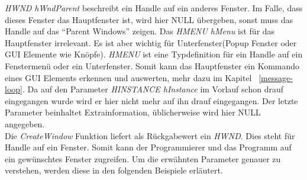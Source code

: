 \textit{HWND hWndParent} beschreibt ein Handle auf ein anderes Fenster. Im Falle, dass dieses Fenster das Hauptfenster ist, wird hier NULL übergeben, sonst muss das Handle auf das "`Parent Windows"' zeigen. Das \textit{HMENU hMenu} ist für das Hauptfenster irrelevant. Es ist aber wichtig für Unterfenster(Popup Fenster oder GUI Elemente wie Knöpfe). \textit{HMENU} ist eine Typdefinition für ein Handle auf ein Fenstermenü oder ein Unterfenster. Somit kann das Hauptfenster ein Kommando eines GUI Elements erkennen und auswerten, mehr dazu im Kapitel ~\ref{message-loop}. Da auf den Parameter \textit{HINSTANCE hInstance} im Vorlauf schon drauf eingegangen wurde wird er hier nicht mehr auf ihn drauf eingegangen. Der letzte Parameter beinhaltet Extrainformation, üblicherweise wird hier NULL angegeben.\\

Die \textit{CreateWindow} Funktion liefert als Rückgabewert ein \textit{HWND}. Dies steht für Handle auf ein Fenster. Somit kann der Programmierer und das Programm auf ein gewünschtes Fenster zugreifen. Um die erwähnten Parameter genauer zu verstehen, werden diese in den folgenden Beispiele erläutert. 

